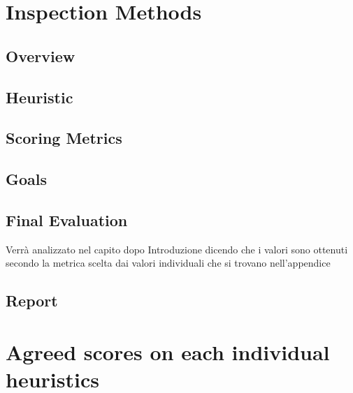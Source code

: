 \documentclass[11pt, a4paperm, hidelinks]{article}
\begin{document}
	\section{Inspection Methods}

	\subsection{Overview}
	

	\subsection{Heuristic}
	

	\subsection{Scoring Metrics}
	

	\subsection{Goals}
	

	\subsection{Final Evaluation}
Verrà analizzato nel capito dopo
Introduzione dicendo che i valori sono ottenuti secondo la metrica scelta dai valori individuali che si trovano nell’appendice


	\subsection{Report}



	\section{Agreed scores on each individual heuristics}
\end{document}
